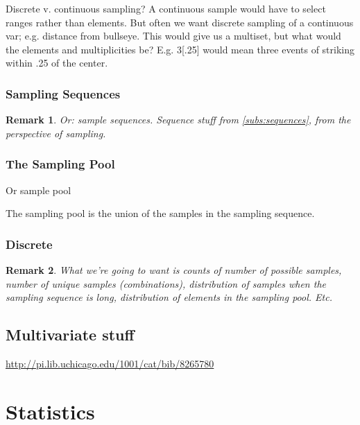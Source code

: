 \documentclass[reqno,12pt]{tufte-book}
\numberwithin{equation}{subsection}
\newtheorem{remark}{Remark}
\begin{document}
Discrete v. continuous sampling?  A continuous sample would have to
select ranges rather than elements.  But often we want discrete
sampling of a continuous var; e.g. distance from bullseye.  This would
give us a multiset, but what would the elements and multiplicities be?
E.g. {3[.25]} would mean three events of striking within .25 of the
center.

\section{Sampling Sequences}

\begin{remark}
  Or: sample sequences.  Sequence stuff from \ref{subs:sequences}, from the perspective of sampling.
\end{remark}

\section{The Sampling Pool}

Or sample pool

The sampling pool is the union of the samples in the sampling sequence.

\section{Discrete}

\begin{remark}
    What we're going to want is counts of number of possible samples,
    number of unique samples (combinations), distribution of samples
    when the sampling sequence is long, distribution of elements in
    the sampling pool.  Etc.
\end{remark}

\chapter{Multivariate stuff}


\href{Exploratory multivariate analysis by example using R}{http://pi.lib.uchicago.edu/1001/cat/bib/8265780}

\part{Statistics}
\end{document}
